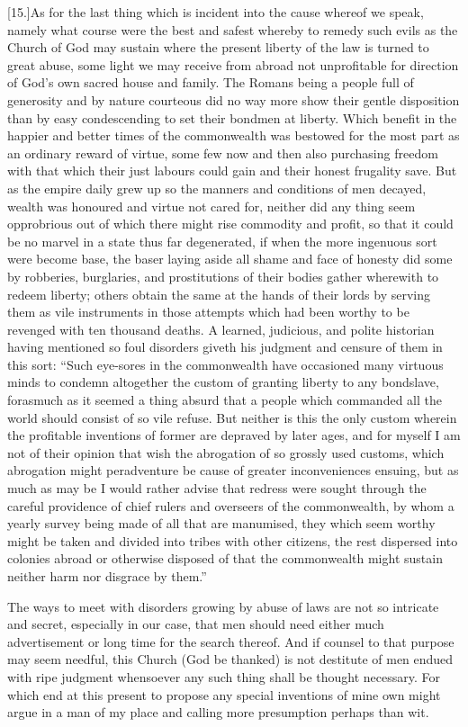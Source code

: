 [15.]As for the last thing which is incident into the cause whereof we speak, namely what course were the best and safest whereby to remedy such evils as the Church of God may sustain where the present liberty of the law is turned to great abuse, some light we may receive from abroad not unprofitable for direction of God’s own sacred house and family. The Romans being a people full of generosity and by nature courteous did no way more show their gentle disposition than by easy condescending to set their bondmen at liberty. Which benefit in the happier and better times of the commonwealth was bestowed for the most part as an ordinary reward of virtue, some few now and then also purchasing freedom with that which their just labours could gain and their honest frugality save. But as the empire daily grew up so the manners and conditions of men decayed, wealth was honoured and virtue not cared for, neither did any thing seem opprobrious out of which there might rise commodity and profit, so that it could be no marvel in a state thus far degenerated, if when the more ingenuous sort were become base, the baser laying aside all shame and face of honesty did some by robberies, burglaries, and prostitutions of their bodies gather wherewith to redeem liberty; others obtain the same at the  hands of their lords by serving them as vile instruments in those attempts which had been worthy to be revenged with ten thousand deaths. A learned, judicious, and polite historian having mentioned so foul disorders giveth his judgment and censure of them in this sort: “Such eye-sores in the commonwealth have occasioned many virtuous minds to condemn altogether the custom of granting liberty to any bondslave, forasmuch as it seemed a thing absurd that a people which commanded all the world should consist of so vile refuse. But neither is this the only custom wherein the profitable inventions of former are depraved by later ages, and for myself I am not of their opinion that wish the abrogation of so grossly used customs, which abrogation might peradventure be cause of greater inconveniences ensuing, but as much as may be I would rather advise that redress were sought through the careful providence of chief rulers and overseers of the commonwealth, by whom a yearly survey being made of all that are manumised, they which seem worthy might be taken and divided into tribes with other citizens, the rest dispersed into colonies abroad or otherwise disposed of that the commonwealth might sustain neither harm nor disgrace by them.”

The ways to meet with disorders growing by abuse of laws are not so intricate and secret, especially in our case, that men should need either much advertisement or long time for the search thereof. And if counsel to that purpose may seem  needful, this Church (God be thanked) is not destitute of men endued with ripe judgment whensoever any such thing shall be thought necessary.
 For which end at this present to propose any special inventions of mine own might argue in a man of my place and calling more presumption perhaps than wit.

